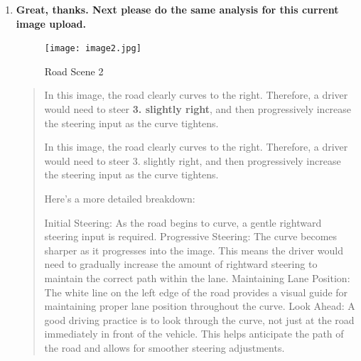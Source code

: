 \begin{enumerate}
    \begin{quote}
        Based on the image, the road appears to curve slightly to the right as it goes into the tree-covered section. Therefore, I would be steering \textbf{3. slightly right}.

Based on the image, the road appears to curve slightly to the right as it goes into the tree-covered section. Therefore, I would be steering 3. slightly right.

It's important to:

    Follow the road's natural path: The white line in the center of the road also angles slightly to the right, indicating the direction of the road.
    Maintain a safe position within the lane: Even though it's a slight curve, gentle steering input is needed to stay centered in the lane.
    Be prepared to adjust: Road conditions can change, so it's always important to be attentive and ready to adjust your steering as needed.

Disclaimer: I am an AI and cannot provide actual driving advice. Always prioritize safe driving practices and follow local traffic laws.

    \end{quote}

    \item \textbf{Great, thanks. Next please do the same analysis for this current image upload.}

    \begin{figure}[h]
        \centering
        \texttt{[image: image2.jpg]} %
        \caption{Road Scene 2}
        \label{fig:image2}
    \end{figure}

    \begin{quote}
        In this image, the road clearly curves to the right. Therefore, a driver would need to steer \textbf{3. slightly right}, and then progressively increase the steering input as the curve tightens.

In this image, the road clearly curves to the right. Therefore, a driver would need to steer 3. slightly right, and then progressively increase the steering input as the curve tightens.

Here's a more detailed breakdown:

    Initial Steering: As the road begins to curve, a gentle rightward steering input is required.
    Progressive Steering: The curve becomes sharper as it progresses into the image. This means the driver would need to gradually increase the amount of rightward steering to maintain the correct path within the lane.
    Maintaining Lane Position: The white line on the left edge of the road provides a visual guide for maintaining proper lane position throughout the curve.
    Look Ahead: A good driving practice is to look through the curve, not just at the road immediately in front of the vehicle. This helps anticipate the path of the road and allows for smoother steering adjustments.


\end{quote}
\end{enumerate}
